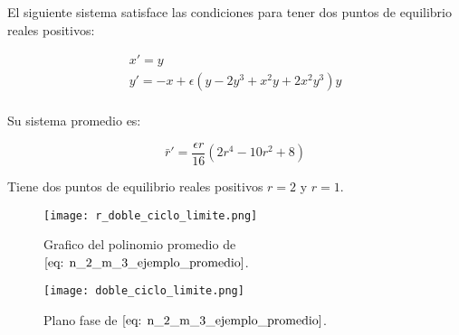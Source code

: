 El siguiente sistema satisface las condiciones para tener dos puntos de equilibrio reales positivos:

\begin{equation}\label{eq: n_2_m_3_ejemplo}
	\begin{matrix}
		x'=y \\
		y'=-x+\epsilon\left(y-2y^3+x^2y+2x^2y^3\right)y \\
	\end{matrix}
\end{equation}

Su sistema promedio es:

\begin{equation}\label{eq: n_2_m_3_ejemplo_promedio}
	\bar{r}'=\frac{\epsilon r}{16}\left(2r^4-10r^2+8\right)
\end{equation}

Tiene dos puntos de equilibrio reales positivos $r=2$ y $r=1$.

\begin{figure}[h]
	\centering
	\texttt{[image: r\_doble\_ciclo\_limite.png]}
	\caption{Grafico del polinomio promedio de $\eqref{eq: n_2_m_3_ejemplo_promedio}$.}
\end{figure}

\begin{figure}[h]
	\centering
	\texttt{[image: doble\_ciclo\_limite.png]}
	\caption{Plano fase de $\eqref{eq: n_2_m_3_ejemplo_promedio}$.}
\end{figure}















